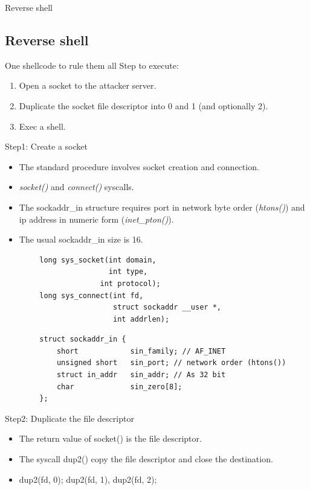 \begin{frame}{Reverse shell}
	\subsection{Reverse shell}
	\ccode
	\begin{block}{One shellcode to rule them all}
		Step to execute:
		\begin{enumerate}
			\item Open a socket to the attacker server.
			\item Duplicate the socket file descriptor into 0 and 1 (and optionally 2).
			\item Exec a shell.
		\end{enumerate}
	\end{block}
	\begin{block}{Step1: Create a socket}
		\begin{itemize}
			\item The standard procedure involves socket creation and connection.
			\item \emph{socket()} and \emph{connect()} syscalls.
			\item The sockaddr\_in structure requires port in network byte order (\emph{htons()}) and ip address in numeric form (\emph{inet\_pton()}).
			\item The usual sockaddr\_in size is 16.
		\end{itemize}
	\end{block}

	\ccode
	\begin{lstlisting}
		long sys_socket(int domain,
		                int type,
                	  int protocol);
		long sys_connect(int fd,
		                 struct sockaddr __user *,
		                 int addrlen);
	\end{lstlisting}

	\ccode
	\begin{lstlisting}
		struct sockaddr_in {
			short            sin_family; // AF_INET
			unsigned short   sin_port; // network order (htons())
			struct in_addr   sin_addr; // As 32 bit
			char             sin_zero[8];
		};
	\end{lstlisting}

	\begin{block}{Step2: Duplicate the file descriptor}
		\begin{itemize}
			\item The return value of socket() is the file descriptor.
			\item The syscall dup2() copy the file descriptor and close the destination.
			\item dup2(fd, 0); dup2(fd, 1), dup2(fd, 2);
		\end{itemize}
	\end{block}


\end{frame}
